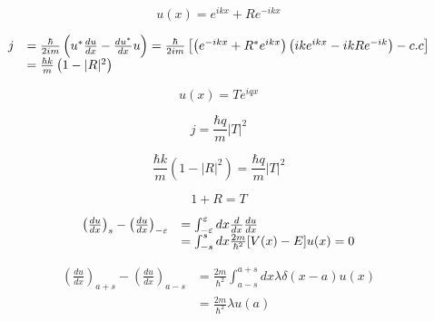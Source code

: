 \documentclass[a4paper,12pt, twoside]{article}
\begin{document}
\begin{equation}
u ( x ) = e ^ { i k x } + R e ^ { - i k x }
\end{equation}


\begin{equation}
\begin{array} { r l } 
{ j } & { = \frac { \hbar } { 2 i m } \left( u ^ { * } \frac { d u } { d x } - \frac { d u ^ { * } } { d x } u \right) = \frac { \hbar } { 2 i m } \left[ \left( e ^ { - i k x } + R ^ { * } e ^ { i k x } \right) \left( i k e ^ { i k x } - i k R e ^ { - i k } \right) - c . c \right] } \\ 
{ } & { = \frac { \hbar k } { m } \left( 1 - | R | ^ { 2 } \right) } \end{array}
\end{equation}

\begin{equation}
u ( x ) = T e ^ { i q x }
\end{equation}





\begin{equation}
j = \frac { \hbar q } { m } | T | ^ { 2 }
\end{equation}



\begin{equation}
\frac { \hbar k } { m } \left( 1 - | R | ^ { 2 } \right) = \frac { \hbar q } { m } | T | ^ { 2 }
\end{equation}



\begin{equation}
1 + R = T
\end{equation}



\begin{equation}
\begin{array} { r l } { \left( \frac { d u } { d x } \right) _ { s } - \left( \frac { d u } { d x } \right) _ { - \varepsilon } } & { = \int _ { - \varepsilon } ^ { \varepsilon } d x \frac { d } { d x } \frac { d u } { d x } } \\ { } & { = \int _ { - s } ^ { s } d x \frac { 2 m } { \hbar ^ { 2 } } [ V ( x ) - E ] u ( x ) = 0 } \end{array}
\end{equation}




\begin{equation}
\begin{aligned} \left( \frac { d u } { d x } \right) _ { a + s } - \left( \frac { d u } { d x } \right) _ { a - s } & = \frac { 2 m } { \hbar ^ { 2 } } \int _ { a - s } ^ { a + s } d x \lambda \delta ( x - a ) u ( x ) \\ & = \frac { 2 m } { \hbar ^ { 2 } } \lambda u ( a ) \end{aligned}
\end{equation}
\end{document}
